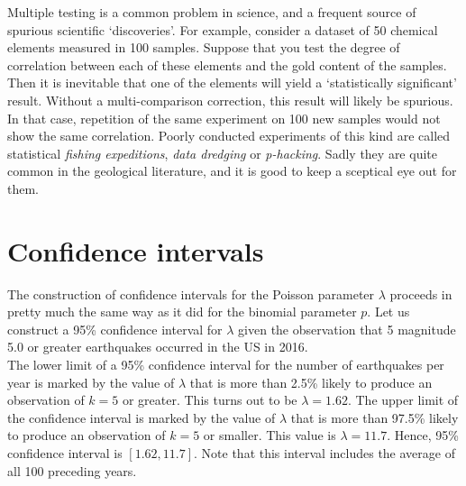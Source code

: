 Multiple testing is a common problem in science, and a frequent source
of spurious scientific `discoveries'. For example, consider a dataset
of 50 chemical elements measured in 100 samples. Suppose that you test
the degree of correlation between each of these elements and the gold
content of the samples. Then it is inevitable that one of the elements
will yield a `statistically significant' result. Without a
multi-comparison correction, this result will likely be spurious. In
that case, repetition of the same experiment on 100 new samples would
not show the same correlation. Poorly conducted experiments of this
kind are called statistical \emph{fishing expeditions}, \emph{data
  dredging} or \emph{p-hacking}. Sadly they are quite common in the
geological literature, and it is good to keep a sceptical eye out for
them.

\section{Confidence intervals}
\label{sec:poisCI}

The construction of confidence intervals for the Poisson parameter
$\lambda$ proceeds in pretty much the same way as it did for the
binomial parameter $p$. Let us construct a 95\% confidence interval
for $\lambda$ given the observation that 5 magnitude 5.0 or greater
earthquakes occurred in the US in 2016.\\

The lower limit of a 95\% confidence interval for the number of
earthquakes per year is marked by the value of $\lambda$ that is more
than 2.5\% likely to produce an observation of $k=5$ or greater. This
turns out to be $\lambda=1.62$. The upper limit of the confidence
interval is marked by the value of $\lambda$ that is more than 97.5\%
likely to produce an observation of $k=5$ or smaller. This value is
$\lambda=11.7$. Hence, 95\% confidence interval is $[1.62, 11.7]$.
Note that this interval includes the average of all 100 preceding
years. \\

